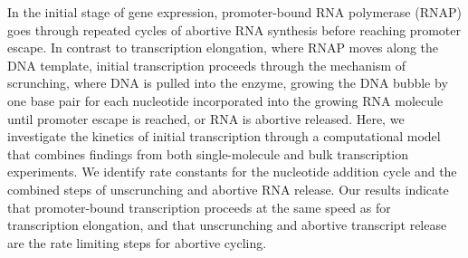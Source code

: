In the initial stage of gene expression, promoter-bound RNA polymerase (RNAP)
goes through repeated cycles of abortive RNA synthesis before reaching
promoter escape. In contrast to transcription elongation, where RNAP moves
along the DNA template, initial transcription proceeds through the mechanism
of scrunching, where DNA is pulled into the enzyme, growing the DNA bubble by
one base pair for each nucleotide incorporated into the growing RNA molecule
until promoter escape is reached, or RNA is abortive released. Here, we
investigate the kinetics of initial transcription through a computational
model that combines findings from both single-molecule and bulk transcription
experiments. We identify rate constants for the nucleotide addition cycle and
the combined steps of unscrunching and abortive RNA release. Our results
indicate that promoter-bound transcription proceeds at the same speed as for
transcription elongation, and that unscrunching and abortive transcript release
are the rate limiting steps for abortive cycling.
